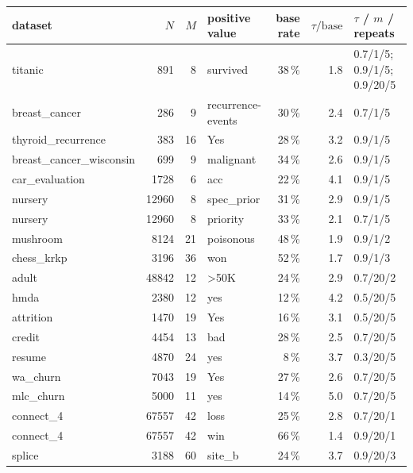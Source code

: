 \begin{tabular}{lrrlrrl}
\toprule
dataset & $N$ & $M$ & positive value & base rate & $\tau/\text{base}$ & $\tau$ / $m$ / repeats\\
\midrule
titanic & 891 & 8 & survived & 38\,\% & 1.8 & 0.7/1/5; 0.9/1/5; 0.9/20/5\\
breast\_cancer & 286 & 9 & recurrence-events & 30\,\% & 2.4 & 0.7/1/5\\
thyroid\_recurrence & 383 & 16 & Yes & 28\,\% & 3.2 & 0.9/1/5\\
breast\_cancer\_wisconsin & 699 & 9 & malignant & 34\,\% & 2.6 & 0.9/1/5\\
car\_evaluation & 1728 & 6 & acc & 22\,\% & 4.1 & 0.9/1/5\\
nursery & 12960 & 8 & spec\_prior & 31\,\% & 2.9 & 0.9/1/5\\
nursery & 12960 & 8 & priority & 33\,\% & 2.1 & 0.7/1/5\\
mushroom & 8124 & 21 & poisonous & 48\,\% & 1.9 & 0.9/1/2\\
chess\_krkp & 3196 & 36 & won & 52\,\% & 1.7 & 0.9/1/3\\
adult & 48842 & 12 & \textgreater{}50K & 24\,\% & 2.9 & 0.7/20/2\\
hmda & 2380 & 12 & yes & 12\,\% & 4.2 & 0.5/20/5\\
attrition & 1470 & 19 & Yes & 16\,\% & 3.1 & 0.5/20/5\\
credit & 4454 & 13 & bad & 28\,\% & 2.5 & 0.7/20/5\\
resume & 4870 & 24 & yes & 8\,\% & 3.7 & 0.3/20/5\\
wa\_churn & 7043 & 19 & Yes & 27\,\% & 2.6 & 0.7/20/5\\
mlc\_churn & 5000 & 11 & yes & 14\,\% & 5.0 & 0.7/20/5\\
connect\_4 & 67557 & 42 & loss & 25\,\% & 2.8 & 0.7/20/1\\
connect\_4 & 67557 & 42 & win & 66\,\% & 1.4 & 0.9/20/1\\
splice & 3188 & 60 & site\_b & 24\,\% & 3.7 & 0.9/20/3\\
\bottomrule
\end{tabular}
